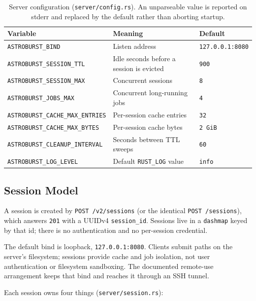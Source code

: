 \documentclass[11pt,a4paper]{article}
\newcommand{\code}[1]{\texttt{\small #1}}
\newcommand{\crate}[1]{\texttt{#1}}
\begin{document}
    \begin{table}[H]
        \centering
        \small
        \begin{tabularx}{\textwidth}{lXl}
            \toprule
            \textbf{Variable} & \textbf{Meaning} & \textbf{Default} \\
            \midrule
            \code{ASTROBURST\_BIND} & Listen address & \code{127.0.0.1:8080} \\
            \code{ASTROBURST\_SESSION\_TTL} & Idle seconds before a session is evicted & \code{900} \\
            \code{ASTROBURST\_SESSION\_MAX} & Concurrent sessions & \code{8} \\
            \code{ASTROBURST\_JOBS\_MAX} & Concurrent long-running jobs & \code{4} \\
            \code{ASTROBURST\_CACHE\_MAX\_ENTRIES} & Per-session cache entries & \code{32} \\
            \code{ASTROBURST\_CACHE\_MAX\_BYTES} & Per-session cache bytes & \code{2\,GiB} \\
            \code{ASTROBURST\_CLEANUP\_INTERVAL} & Seconds between TTL sweeps & \code{60} \\
            \code{ASTROBURST\_LOG\_LEVEL} & Default \code{RUST\_LOG} value & \code{info} \\
            \bottomrule
        \end{tabularx}
        \caption{Server configuration (\code{server/config.rs}). An unparseable value is reported on stderr and replaced by the default rather than aborting startup.}
    \end{table}

    \subsection{Session Model}

    A session is created by \code{POST /v2/sessions} (or the identical \code{POST /sessions}), which answers \code{201} with a UUIDv4 \code{session\_id}. Sessions live in a \crate{dashmap} keyed by that id; there is no authentication and no per-session credential.

    The default bind is loopback, \code{127.0.0.1:8080}. Clients submit paths on the server's filesystem; sessions provide cache and job isolation, not user authentication or filesystem sandboxing. The documented remote-use arrangement keeps that bind and reaches it through an SSH tunnel.

    Each session owns four things (\code{server/session.rs}):
\end{document}
